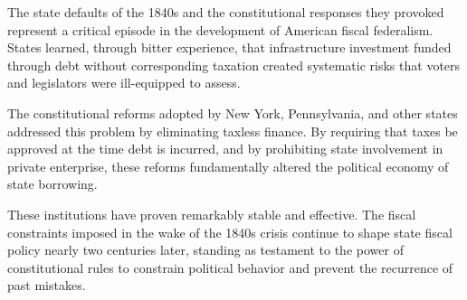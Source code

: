 \documentclass[12pt]{article}
\begin{document}
The state defaults of the 1840s and the constitutional responses they provoked represent a critical episode in the development of American fiscal federalism. States learned, through bitter experience, that infrastructure investment funded through debt without corresponding taxation created systematic risks that voters and legislators were ill-equipped to assess.

The constitutional reforms adopted by New York, Pennsylvania, and other states addressed this problem by eliminating taxless finance. By requiring that taxes be approved at the time debt is incurred, and by prohibiting state involvement in private enterprise, these reforms fundamentally altered the political economy of state borrowing.

These institutions have proven remarkably stable and effective. The fiscal constraints imposed in the wake of the 1840s crisis continue to shape state fiscal policy nearly two centuries later, standing as testament to the power of constitutional rules to constrain political behavior and prevent the recurrence of past mistakes.



\end{document}
